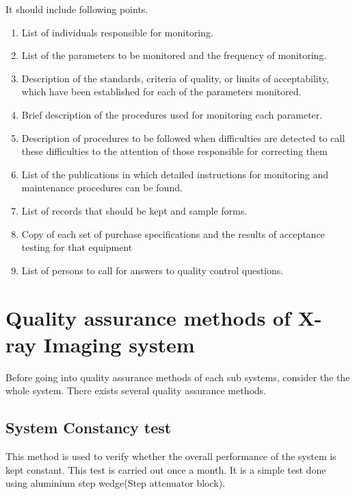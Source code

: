 \documentclass[12pt]{article}
\begin{document}
\begin{enumerate}
It should include following points. 
    \begin{enumerate}
        \item List of individuals responsible for monitoring.
        \item List of the parameters to be monitored and the
frequency of monitoring.

        \item Description of the standards, criteria of quality,
or limits of acceptability, which have been
established for each of the parameters
monitored.
        \item Brief description of the procedures used for
monitoring each parameter.
        \item Description of procedures to be followed when
difficulties are detected to call these difficulties
to the attention of those responsible for
correcting them
        \item List of the publications in which detailed
instructions for monitoring and maintenance
procedures can be found.
        \item List of records that should be kept and sample
forms.
        \item Copy of each set of purchase specifications and
the results of acceptance testing for that
equipment
        \item List of persons to call for answers to quality
control questions. 

        
    \end{enumerate}
\newline
\end{enumerate}

\pagebreak

\section{Quality assurance methods of X-ray Imaging system}
Before going into quality assurance methods of each sub systems, consider the the whole system. There exists several quality assurance methods.

\subsection{System Constancy test}

This method is used to verify whether the overall performance of the system is kept constant. This test is carried out once a month. It is a simple test done using aluminium step wedge(Step attenuator block). 
\end{document}
